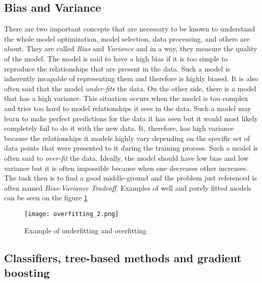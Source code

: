 \documentclass[a4paper,twoside,12pt]{book}
\newcommand*\setcaptioncitation[1]{\def\captioncitation{\textit{Source:}~#1}}
\let\captioncitation\relax
\begin{document}
\subsection{Bias and Variance}

There are two important concepts that are necessary to be known to understand the whole model optimization, model selection, data processing, and others are about. They are called \emph{Bias} and \emph{Variance} and in a way, they measure the quality of the model.
The model is said to have a high bias if it is too simple to reproduce the relationships that are present in the data. Such a model is inherently incapable of representing them and therefore is highly biased. It is also often said that the model \emph{under-fits} the data. On the other side, there is a model that has a high variance. This situation occurs when the model is too complex and tries too hard to model relationships it sees in the data. Such a model may learn to make perfect predictions for the data it has seen but it would most likely completely fail to do it with the new data. It, therefore, has high variance because the relationships it models highly vary depending on the specific set of data points that were presented to it during the training process. Such a model is often said to \emph{over-fit} the data.
Ideally, the model should have low bias and low variance but it is often impossible because when one decreases other increases. The task then is to find a good middle-ground and the problem just referenced is often named \emph{Bias-Variance Tradeoff}. Examples of well and purely fitted models can be seen on the figure \ref{fitting}

\begin{figure}[!htb]
  \centering
  \texttt{[image: overfitting\_2.png]}
  \setcaptioncitation{\url{https://cutt.ly/4jaUM7Y}}
  \caption{Example of underfitting and overfitting}
  \label{fitting}
\end{figure}

\subsection{Classifiers, tree-based methods and gradient boosting}
\end{document}

